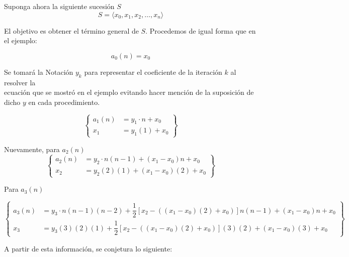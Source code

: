 
Suponga ahora la siguiente sucesión $S$
\[
    S = \langle x_0, x_1, x_2, \dots , x_n\rangle    
\]

El objetivo es obtener el término general de $S$.
Procedemos de igual forma que en el ejemplo:

\[a_0(n) = x_0\]

Se tomará la Notación $y_k$ para representar el coeficiente
de la iteración $k$ al resolver la\\ ecuación que se mostró en el
ejemplo evitando hacer mención de la suposición de dicho $y$ en cada
procedimiento.

\begin{equation*}
    \left\{
        \begin{aligned}
            a_1(n) &= y_1 \cdot n + x_0\\
            x_1 &= y_1(1) + x_0
        \end{aligned}
    \right\}
\end{equation*}

Nuevamente, para $a_2(n)$
\begin{equation*}
    \left\{
        \begin{aligned}
            a_2(n) &= y_2 \cdot n(n-1) + (x_1 - x_0)n + x_0\\
            x_2 &= y_2(2)(1) + (x_1 - x_0)(2) + x_0
        \end{aligned}  
    \right\}
\end{equation*}

Para $a_3(n)$

\begin{equation*}
    \left\{
        \begin{aligned}
            a_3(n) &= y_3 \cdot n(n-1)(n-2) + \dfrac{1}{2}[x_2 - ((x_1  - x_0)(2) + x_0)]n(n-1) + (x_1 - x_0)n + x_0\\
            x_3 &= y_3 (3)(2)(1) + \dfrac{1}{2}[x_2 - ((x_1  - x_0)(2) + x_0)](3)(2) + (x_1 - x_0)(3) + x_0
        \end{aligned}
    \right\}
\end{equation*}

A partir de esta información, se conjetura lo siguiente:

